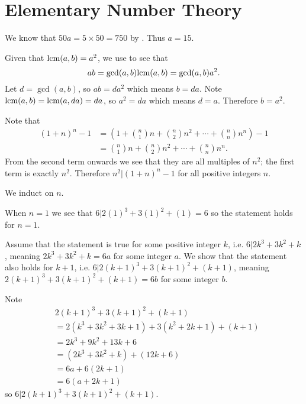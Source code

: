 \section{Elementary Number Theory}
\begin{questions}
    \item We know that $50a = 5 \times 50 = 750$ by . Thus $a = 15$.
    
    \item Given that $\mathrm{lcm}(a,b) = a^2$, we use  to see that
    \[
        ab = \gcd(a,b)\mathrm{lcm}(a,b) = \gcd(a,b)a^2.
    \]
    Let $d = \gcd(a,b)$, so $ab = da^2$ which means $b = da$. Note $\mathrm{lcm}(a,b) = \mathrm{lcm}(a, da) = da$, so $a^2 = da$ which means $d = a$. Therefore $b = a^2$.
    
    \item Note that
    \begin{align*}
        (1+n)^n - 1 &= \left(1 + {n \choose 1}n + {n \choose 2}n^2 + \cdots + {n \choose n}n^n\right) - 1\\
        &= {n \choose 1}n + {n \choose 2}n^2 + \cdots + {n \choose n}n^n.
    \end{align*}
    From the second term onwards we see that they are all multiples of $n^2$; the first term is exactly $n^2$. Therefore $n^2 \vert (1+n)^n - 1$ for all positive integers $n$.

    \item \begin{partquestions}{\roman*}
        \item We induct on $n$.
        
        When $n = 1$ we see that $6 \vert 2(1)^3 + 3(1)^2 + (1) = 6$ so the statement holds for $n = 1$.

        Assume that the statement is true for some positive integer $k$, i.e. $6 \vert 2k^3 + 3k^2 + k$, meaning $2k^3 + 3k^2 + k = 6a$ for some integer $a$. We show that the statement also holds for $k + 1$, i.e. $6 \vert 2(k+1)^3 + 3(k+1)^2 + (k+1)$, meaning $2(k+1)^3 + 3(k+1)^2 + (k+1) = 6b$ for some integer $b$.

        Note
        \begin{align*}
            &2(k+1)^3 + 3(k+1)^2 + (k+1)\\
            &= 2(k^3+3k^2+3k+1) + 3(k^2+2k+1) + (k+1)\\
            &= 2k^3 + 9k^2 + 13k + 6\\
            &= (2k^3 + 3k^2 + k) + (12k + 6)\\
            &= 6a + 6(2k + 1)\\
            &= 6(a + 2k + 1)
        \end{align*}
        so $6 \vert 2(k+1)^3 + 3(k+1)^2 + (k+1)$.


\end{partquestions}
\end{questions}
